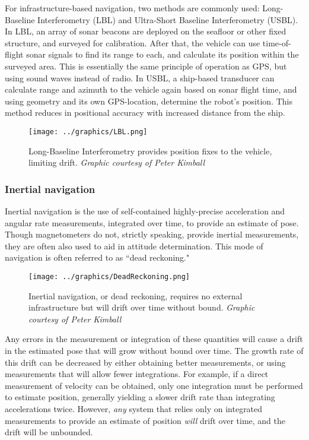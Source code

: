 For infrastructure-based navigation, two methods are commonly used: Long-Baseline Interferometry (LBL) and Ultra-Short Baseline Interferometry (USBL). In LBL, an array of sonar beacons are deployed on the seafloor or other fixed structure, and surveyed for calibration. After that, the vehicle can use time-of-flight sonar signals to find its range to each, and calculate its position within the surveyed area. This is essentially the same principle of operation as GPS, but using sound waves instead of radio. In USBL, a ship-based transducer can calculate range and azimuth to the vehicle again based on sonar flight time, and using geometry and its own GPS-location, determine the robot's position. This method reduces in positional accuracy with increased distance from the ship. 

\begin{figure}[htbp]
   \centering
   \texttt{[image: ../graphics/LBL.png]} %
   \caption{Long-Baseline Interferometry provides position fixes to the vehicle, limiting drift. \emph{Graphic courtesy of Peter Kimball}}
   \label{fig:LBL}
\end{figure}

\subsubsection{Inertial navigation}

Inertial navigation is the use of self-contained highly-precise acceleration and angular rate measurements, integrated over time, to provide an estimate of pose. Though magnetometers do not, strictly speaking, provide inertial measurements, they are often also used to aid in attitude determination. This mode of navigation is often referred to as ``dead reckoning."

\begin{figure}[htbp]
   \centering
   \texttt{[image: ../graphics/DeadReckoning.png]} %
   \caption{Inertial navigation, or dead reckoning, requires no external infrastructure but will drift over time without bound. \emph{Graphic courtesy of Peter Kimball}}
   \label{fig:inertialNav}
\end{figure}

Any errors in the measurement or integration of these quantities will cause a drift in the estimated pose that will grow without bound over time. The growth rate of this drift can be decreased by either obtaining better measurements, or using measurements that will allow fewer integrations. For example, if a direct measurement of velocity can be obtained, only one integration must be performed to estimate position, generally yielding a slower drift rate than integrating accelerations twice. However, \emph{any} system that relies only on integrated measurements to provide an estimate of position \emph{will} drift over time, and the drift will be unbounded. 

